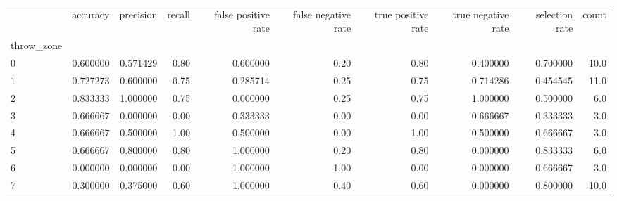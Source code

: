\begin{tabular}{lrrrrrrrrr}
\toprule
{} &  accuracy &  precision &  recall &  false positive rate &  false negative rate &  true positive rate &  true negative rate &  selection rate &  count \\
throw\_zone &           &            &         &                      &                      &                     &                     &                 &        \\
\midrule
0          &  0.600000 &   0.571429 &    0.80 &             0.600000 &                 0.20 &                0.80 &            0.400000 &        0.700000 &   10.0 \\
1          &  0.727273 &   0.600000 &    0.75 &             0.285714 &                 0.25 &                0.75 &            0.714286 &        0.454545 &   11.0 \\
2          &  0.833333 &   1.000000 &    0.75 &             0.000000 &                 0.25 &                0.75 &            1.000000 &        0.500000 &    6.0 \\
3          &  0.666667 &   0.000000 &    0.00 &             0.333333 &                 0.00 &                0.00 &            0.666667 &        0.333333 &    3.0 \\
4          &  0.666667 &   0.500000 &    1.00 &             0.500000 &                 0.00 &                1.00 &            0.500000 &        0.666667 &    3.0 \\
5          &  0.666667 &   0.800000 &    0.80 &             1.000000 &                 0.20 &                0.80 &            0.000000 &        0.833333 &    6.0 \\
6          &  0.000000 &   0.000000 &    0.00 &             1.000000 &                 1.00 &                0.00 &            0.000000 &        0.666667 &    3.0 \\
7          &  0.300000 &   0.375000 &    0.60 &             1.000000 &                 0.40 &                0.60 &            0.000000 &        0.800000 &   10.0 \\
\bottomrule
\end{tabular}
